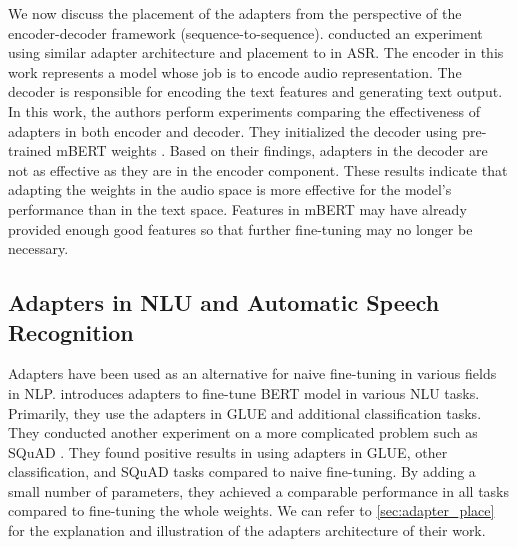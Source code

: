 We now discuss the placement of the adapters from the perspective of the encoder-decoder framework (sequence-to-sequence).  conducted an experiment using similar adapter architecture and placement to  in ASR. The encoder in this work represents a model whose job is to encode audio representation. The decoder is responsible for encoding the text features and generating text output. In this work, the authors perform experiments comparing the effectiveness of adapters in both encoder and decoder. They initialized the decoder using pre-trained mBERT weights . Based on their findings, adapters in the decoder are not as effective as they are in the encoder component. These results indicate that adapting the weights in the audio space is more effective for the model's performance than in the text space. Features in mBERT may have already provided enough good features so that further fine-tuning may no longer be necessary.

\subsection{Adapters in NLU and Automatic Speech Recognition}
\label{sec:app_nlu_asr}
Adapters have been used as an alternative for naive fine-tuning in various fields in NLP.  introduces adapters to fine-tune BERT model in various NLU tasks. Primarily, they use the adapters in GLUE  and additional classification tasks. They conducted another experiment on a more complicated problem such as SQuAD . They found positive results in using adapters in GLUE, other classification, and SQuAD tasks compared to naive fine-tuning. By adding a small number of parameters, they achieved a comparable performance in all tasks compared to fine-tuning the whole weights. We can refer to \cref{sec:adapter_place} for the explanation and illustration of the adapters architecture of their work.

